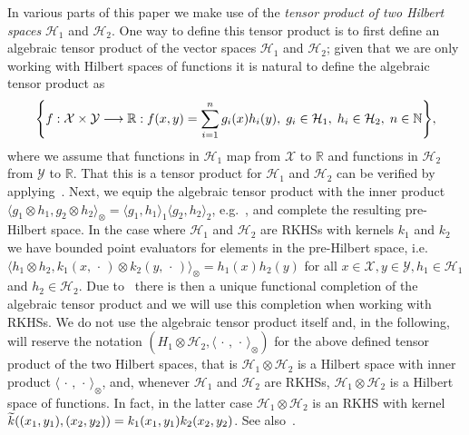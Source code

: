 \documentclass[AHL,Unicode,longabstracts,published]{cedram}
\theoremstyle{remark}
\newcommand{\R}{\mathbb{R}}
\newcommand{\bbN}{\mathbb{N}}
\newcommand{\X}{\mathcal{X}}
\newcommand{\Y}{\mathcal{Y}}
\newcommand{\cH}{\mathcal{H}}
\let\oldtilde\tilde
\renewcommand*{\tilde}[1]{\mathchoice{\widetilde{#1}}{\widetilde{#1}}{\oldtilde{#1}}{\oldtilde{#1}}}
\renewcommand*{\to}{\mathchoice{\longrightarrow}{\rightarrow}{\rightarrow}{\rightarrow}}
\let\originalleft\left
\let\originalright\right
\renewcommand{\left}{\mathopen{}\mathclose\bgroup\originalleft}
\renewcommand{\right}{\aftergroup\egroup\originalright}
\begin{document}
In various parts of this paper we make use of the \emph{tensor product of two Hilbert spaces} $\cH_1$ and $\cH_2$. One way to define this tensor product is to first define an algebraic tensor product of the vector spaces $\cH_1$ and $\cH_2$; given that we are only working with Hilbert spaces of functions it is natural to define the algebraic tensor product as
\[
\left\{f:\X \times \Y \to \R : f(x,y) = \sum_{i=1}^n g_i(x) h_i(y),\; g_i \in \cH_1,\; h_i \in \cH_2,\; n\in \bbN \right\},
\]
where we assume that functions in $\cH_1$ map from $\X$ to $\R$ and functions in $\cH_2$ from $\Y$ to $\R$. That this is a tensor product for $\cH_1$ and $\cH_2$ can be verified by applying~\cite[Criterion~2.3]{DEF92}. Next, we equip the algebraic tensor product with the inner product $ \langle g_1 \otimes h_1, g_2 \otimes h_2 \rangle_\otimes = \langle g_1, h_1 \rangle_1 \langle g_2, h_2 \rangle_2$, e.g.~\cite[Theorem~6.3.1]{MUR90}, and complete the resulting pre-Hilbert space. In the case where $\cH_1$ and $\cH_2$ are RKHSs with kernels $k_1$ and $k_2$ we have bounded point evaluators for elements in the pre-Hilbert space, i.e. $\langle h_1 \otimes h_2, k_1(x,\,\cdot\,) \otimes k_2(y,\,\cdot\,) \rangle_\otimes = h_1(x) h_2(y)$ for all $x \in \X, y\in \Y, h_1 \in \cH_1$ and $h_2 \in \cH_2$. Due to~\cite[2nd theorem, \S4 p.~347]{ARON50} there is then a unique functional completion of the algebraic tensor product and we will use this completion when working with RKHSs. We do not use the algebraic tensor product itself and, in the following, will reserve the notation $(H_1 \otimes \cH_2, \langle \,\cdot\,,\,\cdot\, \rangle_\otimes)$ for the above defined tensor product of the two Hilbert spaces, that is $\cH_1 \otimes \cH_2$ is a Hilbert space with inner product $\langle \,\cdot\,,\,\cdot\, \rangle_\otimes$, and, whenever $\cH_1$ and $\cH_2$ are RKHSs, $\cH_1 \otimes \cH_2$ is a Hilbert space of functions. In fact, in the latter case $\cH_1 \otimes \cH_2$ is an RKHS with kernel $\tilde k((x_1,y_1),(x_2,y_2)) = k_1(x_1,y_1) k_2(x_2,y_2)$. See also~\cite[Theorem~5.11]{PAUL16}.
\end{document}
